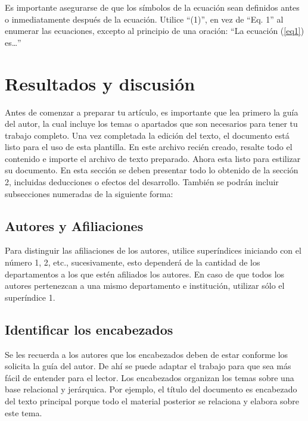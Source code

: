         Es importante asegurarse de que los símbolos de la ecuación sean definidos antes o inmediatamente después de la ecuación. Utilice “(1)”, en vez de “Eq. 1” al enumerar las ecuaciones, excepto al principio de una oración: “La ecuación (\ref{eq1}) es…”
        
        \section{Resultados y discusión}
        
        Antes de comenzar a preparar tu artículo, es importante que lea primero la guía del autor, la cual incluye los temas o apartados que son necesarios para tener tu trabajo completo.
        Una vez completada la edición del texto, el documento está listo para el uso de esta plantilla. En este archivo recién creado, resalte todo el contenido e importe el archivo de texto preparado. Ahora esta listo para estilizar su documento.
        En esta sección se deben presentar todo lo obtenido de la sección 2, incluidas deducciones o efectos del desarrollo. También se podrán incluir subsecciones numeradas de la siguiente forma:
        
        \subsection{Autores y Afiliaciones}
        
        Para distinguir las afiliaciones de los autores, utilice superíndices iniciando con el número 1, 2, etc., sucesivamente, esto dependerá de la cantidad de los departamentos a los que estén afiliados los autores. En caso de que todos los autores pertenezcan a una mismo departamento e institución, utilizar sólo el superíndice 1. 
        
        \subsection{Identificar los encabezados}
        
        Se les recuerda a los autores que los encabezados deben de estar conforme los solicita la guía del autor. De ahí se puede adaptar el trabajo para que sea más fácil de entender para el lector.
        Los encabezados organizan los temas sobre una base relacional y jerárquica. Por ejemplo, el título del documento es encabezado del texto principal porque todo el material posterior se relaciona y elabora sobre este tema. 
        
